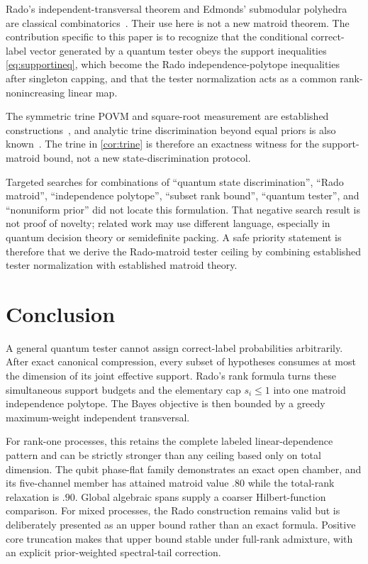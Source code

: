 \documentclass[11pt]{article}
\theoremstyle{definition}
\theoremstyle{remark}
\begin{document}
Rado's independent-transversal theorem and Edmonds' submodular polyhedra are
classical combinatorics~\cite{rado1942,edmonds1970}.  Their use here is not a
new matroid theorem.  The contribution specific to this paper is to recognize that the
conditional correct-label vector generated by a quantum tester obeys the
support inequalities \cref{eq:supportineq}, which become the Rado
independence-polytope inequalities after singleton capping, and that the
tester normalization acts as a common rank-nonincreasing linear map.

The symmetric trine POVM and square-root measurement are established
constructions~\cite{ban1997,eldarforney2001}, and analytic trine
discrimination beyond equal priors is also known~\cite{weir2018}.  The trine
in \cref{cor:trine} is therefore an exactness witness for the support-matroid
bound, not a new state-discrimination protocol.

Targeted searches for combinations of ``quantum state discrimination'',
``Rado matroid'', ``independence polytope'', ``subset rank bound'', ``quantum
tester'', and ``nonuniform prior'' did not locate this formulation.  That
negative search result is not proof of novelty; related work may use different
language, especially in quantum decision theory or semidefinite packing.  A
safe priority statement is therefore that we derive the Rado-matroid tester
ceiling by combining established tester normalization with established
matroid theory.

\section{Conclusion}

A general quantum tester cannot assign correct-label probabilities
arbitrarily.  After exact canonical compression, every subset of hypotheses
consumes at most the dimension of its joint effective support.  Rado's rank
formula turns these simultaneous support budgets and the elementary cap
$s_i\leq1$ into one matroid independence polytope.  The Bayes objective is
then bounded by a greedy maximum-weight independent transversal.

For rank-one processes, this retains the complete labeled linear-dependence
pattern and can be strictly stronger than any ceiling based only on total
dimension.  The qubit phase-flat family demonstrates an exact open chamber,
and its five-channel member has attained matroid value $.80$ while the
total-rank relaxation is $.90$.  Global algebraic spans supply a coarser
Hilbert-function comparison.  For mixed processes, the Rado construction
remains valid but is deliberately presented as an upper bound rather than an
exact formula.  Positive core truncation makes that upper bound stable under
full-rank admixture, with an explicit prior-weighted spectral-tail correction.
\end{document}
